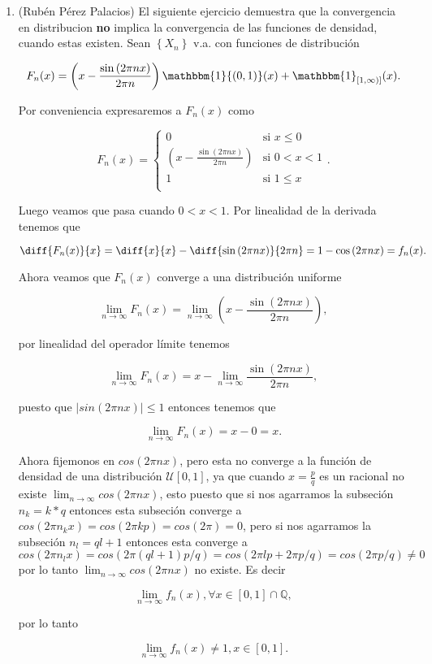 \documentclass[letterpaper]{article}
\theoremstyle{definition}
\theoremstyle{lemathm}
\theoremstyle{lemademthm}
\newcommand{\limninf}{\lim_{n\to\infty}}
\newcommand{\pars}[1]{\left( #1 \right) }
\newcommand{\bracs}[1]{\left[ #1 \right] }
\newcommand{\set}[1]{\left \{ #1 \right\} }
\newcommand{\QQ}{\mathbb{Q}}
\newcommand{\1}{\mathbbm{1}}
\begin{document}
\begin{enumerate}
		\item (Rubén Pérez Palacios) El siguiente ejercicio demuestra que la convergencia en distribucion \textbf{no} implica la convergencia de las
		funciones de densidad, cuando estas existen. Sean $\set{X_n}$ v.a. con funciones de distribución

		\[F_n(x) = \pars{x - \frac{\sin\pars{2\pi nx}}{2\pi n}} \1{(0,1)}(x) + \1_{[1,\infty)]}(x).\]

		Por conveniencia expresaremos a $F_n(x)$ como 

		\[F_n(x) = \begin{cases}
			0 & \text{si } x \leq 0\\
			\pars{x - \frac{\sin\pars{2\pi nx}}{2\pi n}} & \text{si } 0 < x < 1\\
			1 & \text{si } 1 \leq x\\
		\end{cases}.\]

		Luego veamos que pasa cuando $0 < x < 1$. Por linealidad de la derivada tenemos que

		\[\diff{F_n(x)}{x} = \diff{x}{x} - \diff{\sin\pars{2\pi nx}}{2\pi n} = 1 - \cos\pars{2\pi nx} = f_n(x).\]

		Ahora veamos que $F_n(x)$ converge a una distribución uniforme

		\[\limninf F_n(x) = \limninf \pars{x - \frac{\sin\pars{2\pi nx}}{2\pi n}},\]

		por linealidad del operador límite tenemos

		\[\limninf F_n(x) = x - \limninf \frac{\sin\pars{2\pi nx}}{2\pi n},\]

		puesto que $|sin(2\pi nx)| \leq 1$ entonces tenemos que

		\[\limninf F_n(x) = x - 0 = x.\]

		Ahora fijemonos en $cos(2\pi n x)$, pero esta no converge a la función de densidad de una distribución $\mathcal{U}\bracs{0,1}$, ya que cuando $x = \frac{p}{q}$ es un racional no existe $\limninf cos(2\pi nx)$,  esto puesto que si nos agarramos la subseción $n_k = k*q$ entonces esta subseción converge a $cos(2\pi n_kx) = cos(2\pi kp) = cos(2\pi) = 0$, pero si nos agarramos la subseción $n_l = ql + 1$ entonces esta converge a $cos(2\pi n_lx) = cos(2\pi (ql + 1)p/q) = cos(2\pi lp + 2\pi p/q) = cos(2\pi p/q) \neq 0$ por lo tanto $\limninf cos(2\pi nx)$ no existe. Es decir

		\[\limninf f_n(x), \forall x \in \bracs{0,1}\cap\QQ,\]

		por lo tanto

		\[\limninf f_n(x) \neq 1, x\in[0,1].\]


    \end{enumerate}

	
\end{document}
